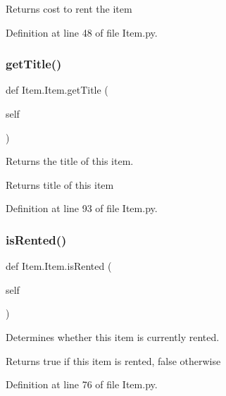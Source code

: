 \begin{DoxyReturn}{Returns}
cost to rent the item 
\end{DoxyReturn}


Definition at line 48 of file Item.\+py.

\mbox{\label{classItem_1_1Item_a2b359025258f0b0f0ef33d7da4f806fa}} 
\subsubsection{\texorpdfstring{get\+Title()}{getTitle()}}
{\footnotesize\ttfamily def Item.\+Item.\+get\+Title (\begin{DoxyParamCaption}\item[{}]{self }\end{DoxyParamCaption})}



Returns the title of this item. 

\begin{DoxyReturn}{Returns}
title of this item 
\end{DoxyReturn}


Definition at line 93 of file Item.\+py.

\mbox{\label{classItem_1_1Item_a2dcb80d5765c07aefe735cd657385764}} 
\subsubsection{\texorpdfstring{is\+Rented()}{isRented()}}
{\footnotesize\ttfamily def Item.\+Item.\+is\+Rented (\begin{DoxyParamCaption}\item[{}]{self }\end{DoxyParamCaption})}



Determines whether this item is currently rented. 

\begin{DoxyReturn}{Returns}
true if this item is rented, false otherwise 
\end{DoxyReturn}


Definition at line 76 of file Item.\+py.

